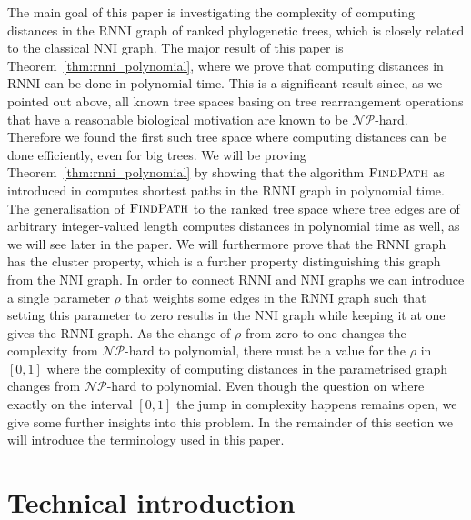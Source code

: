 \documentclass[11pt]{amsart}
\newcommand{\rnni}{\mathrm{RNNI}}
\newcommand{\findpath}{\textsc{FindPath}}
\newcommand{\nni}{\mathrm{NNI}}
\newcommand{\np}{\mathcal{NP}}
\newcommand{\summary}[1]{} %
\begin{document}
\summary{Paper summary in light of motivation: We've discovered the first efficiently computable distance, given by a parameter range in known tree spaces, and want to understand the reason for the complexity jump -- cite ``Beyond worst-case complexity.''}
The main goal of this paper is investigating the complexity of computing distances in the $\rnni$ graph of ranked phylogenetic trees, which is closely related to the classical $\nni$ graph.
The major result of this paper is Theorem~\ref{thm:rnni_polynomial}, where we prove that computing distances in $\rnni$ can be done in polynomial time.
This is a significant result since, as we pointed out above, all known tree spaces basing on tree rearrangement operations that have a reasonable biological motivation are known to be $\np$-hard.
Therefore we found the first such tree space where computing distances can be done efficiently, even for big trees.
We will be proving Theorem~\ref{thm:rnni_polynomial} by showing that the algorithm $\findpath$ as introduced in \autocite{Collienne2019-ca} computes shortest paths in the $\rnni$ graph in polynomial time.
The generalisation of $\findpath$ to the ranked tree space where tree edges are of arbitrary integer-valued length computes distances in polynomial time as well, as we will see later in the paper.
We will furthermore prove that the $\rnni$ graph has the cluster property, which is a further property distinguishing this graph from the $\nni$ graph.
In order to connect $\rnni$ and $\nni$ graphs we can introduce a single parameter $\rho$ that weights some edges in the $\rnni$ graph such that setting this parameter to zero results in the $\nni$ graph while keeping it at one gives the $\rnni$ graph.
As the change of $\rho$ from zero to one changes the complexity from $\np$-hard to polynomial, there must be a value for the $\rho$ in $[0,1]$ where the complexity of computing distances in the parametrised graph changes from $\np$-hard to polynomial.
Even though the question on where exactly on the interval $[0,1]$ the jump in complexity happens remains open, we give some further insights into this problem.
In the remainder of this section we will introduce the terminology used in this paper.


\section{Technical introduction}
\end{document}
